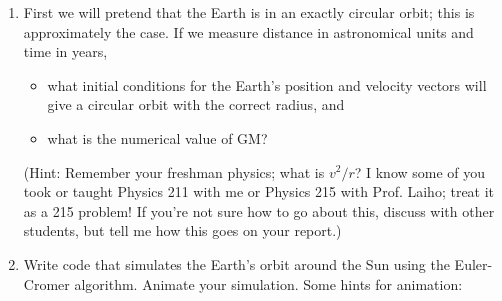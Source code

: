 \documentclass[12pt]{article}
\def\LT{\textlangle{}}
\def\RT{\textrangle{}}
\begin{document}
\begin{enumerate}
\item First we will pretend that the Earth is in an exactly circular orbit;
  this is approximately the case. If we measure distance in astronomical units
    and time in years,
	\begin{itemize}
  \item{what initial conditions for the Earth's position and velocity 
    vectors will give a circular orbit with the correct radius, and}
  \item{what is the numerical value of GM?}
  \end{itemize}

  (Hint: Remember your freshman physics; what is $v^2/r$? I know some of you 
   took or taught Physics 211 with me or Physics 215 with Prof. Laiho; treat it as a 215 problem! If you're not 
   sure how to go about this, discuss with other students, but tell me how this goes on your report.)
 

\item Write code that simulates the Earth's orbit around the Sun using the Euler-Cromer algorithm. Animate your simulation. Some hints for animation:





\end{enumerate}
\end{document}
